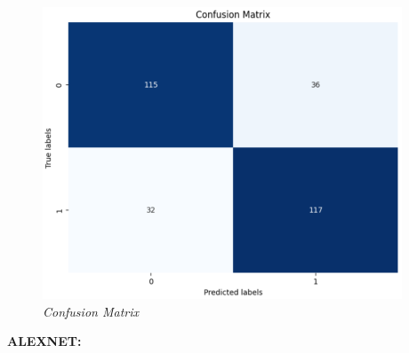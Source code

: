 \documentclass[12pt, a4paper]{report}
\begin{document}
\begin{figure}[htbp]
    \hspace{0.03\textwidth}
    \begin{minipage}{0.3\textwidth}
        \centering
        \includegraphics[width=\linewidth]{report images/image26.png}
        \caption{\textit{Confusion Matrix}}
    \end{minipage}
\end{figure}

\vspace{3cm}

\textbf{ALEXNET:}
\end{document}
